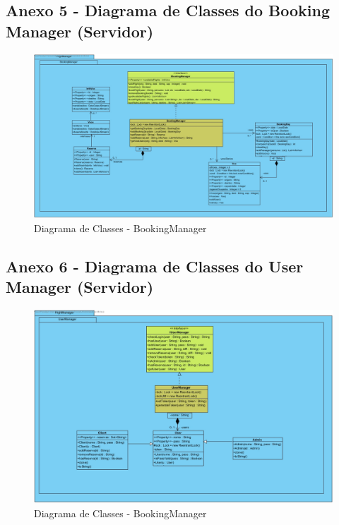\documentclass[a4paper,11pt]{article}
\begin{document}
\begin{landscape}
    \subsection{Anexo 5 - Diagrama de Classes do Booking Manager (Servidor)}
    \begin{figure}[!ht]
        \centering
        \includegraphics[width=0.9\linewidth]{diagramas/BookingManagerClassDiagram.jpg}
        \caption{Diagrama de Classes - BookingManager} \label{img:booking_manager}
    \end{figure}
\end{landscape}

\begin{landscape}
    \subsection{Anexo 6 - Diagrama de Classes do User Manager (Servidor)}
    \begin{figure}[!ht]
        \centering
        \includegraphics[width=0.75\linewidth]{diagramas/UserManagerClassDiagram.jpg}
        \caption{Diagrama de Classes - BookingManager} \label{img:user_manager}
    \end{figure}
\end{landscape}
\end{document}
